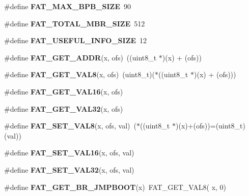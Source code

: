 \begin{DoxyCompactItemize}
\item 
\mbox{\label{group__libfs__dosfs_ga8aab12683f2f9d7a2a52a6df7c556ff9}} 
\#define {\bfseries F\+A\+T\+\_\+\+M\+A\+X\+\_\+\+B\+P\+B\+\_\+\+S\+I\+ZE}~90
\item 
\mbox{\label{group__libfs__dosfs_ga66e3e08fcebc85ddcd8e86becd67a2d4}} 
\#define {\bfseries F\+A\+T\+\_\+\+T\+O\+T\+A\+L\+\_\+\+M\+B\+R\+\_\+\+S\+I\+ZE}~512
\item 
\mbox{\label{group__libfs__dosfs_gacb24648473e17767b45d3a70f47a5e8e}} 
\#define {\bfseries F\+A\+T\+\_\+\+U\+S\+E\+F\+U\+L\+\_\+\+I\+N\+F\+O\+\_\+\+S\+I\+ZE}~12
\item 
\mbox{\label{group__libfs__dosfs_ga222331e1a844be62c6333d25c2b03ac8}} 
\#define {\bfseries F\+A\+T\+\_\+\+G\+E\+T\+\_\+\+A\+D\+DR}(x,  ofs)~((uint8\+\_\+t $\ast$)(x) + (ofs))
\item 
\mbox{\label{group__libfs__dosfs_gaf088436ff277645c3414b049d6110825}} 
\#define {\bfseries F\+A\+T\+\_\+\+G\+E\+T\+\_\+\+V\+A\+L8}(x,  ofs)~(uint8\+\_\+t)($\ast$((uint8\+\_\+t $\ast$)(x) + (ofs)))
\item 
\#define {\bfseries F\+A\+T\+\_\+\+G\+E\+T\+\_\+\+V\+A\+L16}(x,  ofs)
\item 
\#define {\bfseries F\+A\+T\+\_\+\+G\+E\+T\+\_\+\+V\+A\+L32}(x,  ofs)
\item 
\mbox{\label{group__libfs__dosfs_ga217dc99bab976ca766b35e8dc052a418}} 
\#define {\bfseries F\+A\+T\+\_\+\+S\+E\+T\+\_\+\+V\+A\+L8}(x,  ofs,  val)~($\ast$((uint8\+\_\+t $\ast$)(x)+(ofs))=(uint8\+\_\+t)(val))
\item 
\#define {\bfseries F\+A\+T\+\_\+\+S\+E\+T\+\_\+\+V\+A\+L16}(x,  ofs,  val)
\item 
\#define {\bfseries F\+A\+T\+\_\+\+S\+E\+T\+\_\+\+V\+A\+L32}(x,  ofs,  val)
\item 
\mbox{\label{group__libfs__dosfs_ga1acee5ef998e54a703d99bc50b620b89}} 
\#define {\bfseries F\+A\+T\+\_\+\+G\+E\+T\+\_\+\+B\+R\+\_\+\+J\+M\+P\+B\+O\+OT}(x)~F\+A\+T\+\_\+\+G\+E\+T\+\_\+\+V\+A\+L8( x,  0)
\item 
\mbox{\label{group__libfs__dosfs_ga1d9e074a5885e05876a689d731b353c4}} 

\end{DoxyCompactItemize}
